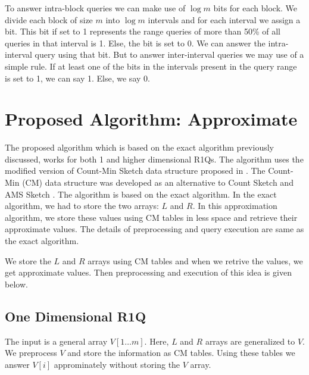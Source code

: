 \documentclass{article}
\begin{document}
To answer intra-block queries we can make use of $\log m$ bits for each block. We divide each block of size $m$ into $\log m$ intervals and for each interval we assign a bit. This bit if set to 1 represents the range queries of more than 50\% of all queries in that interval is 1. Else, the bit is set to 0. We can answer the intra-interval query using that bit. But to answer inter-interval queries we may use of a simple rule. If at least one of the bits in the intervals present in the query range is set to 1, we can say 1. Else, we say 0.

\section{Proposed Algorithm: Approximate}
The proposed algorithm which is based on the exact algorithm previously discussed, works for both 1 and higher dimensional R1Qs. The algorithm uses the modified version of Count-Min Sketch data structure proposed in \cite{cormodemuthu}. The Count-Min (CM) data structure was developed as an alternative to Count Sketch \cite{charikarcolton} and AMS Sketch \cite{alonszegedy}. The algorithm is based on the exact algorithm. In the exact algorithm, we had to store the two arrays: $L$ and $R$. In this approximation algorithm, we store these values using CM tables in less space and retrieve their approximate values. The details of preprocessing and query execution are same as the exact algorithm.

We store the $L$ and $R$ arrays using CM tables and when we retrive the values, we get approximate values. Then preprocessing and execution of this idea is given below.

\subsection{One Dimensional R1Q}
The input is a general array $V[1 \ldots m]$. Here, $L$ and $R$ arrays are generalized to $V$. We preprocess $V$ and store the information as CM tables. Using these tables we answer $V[i]$ approminately without storing the $V$ array. 
\end{document}
